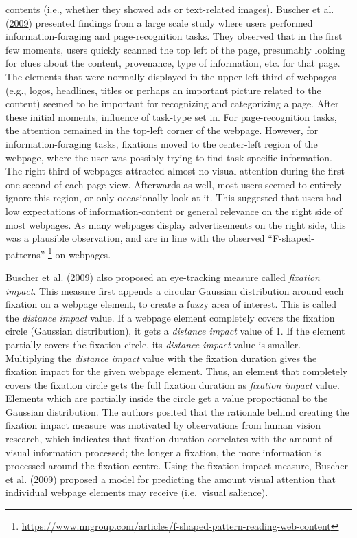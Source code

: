 \documentclass[a4paper, nobind]{templates/ociamthesis}
\begin{document}
contents (i.e., whether they showed ads or text-related images). Buscher et al. (\protect\hyperlink{ref-110}{2009})
presented findings from a large scale study where users performed
information-foraging and page-recognition tasks. They observed that in
the first few moments, users quickly scanned the top left of the page,
presumably looking for clues about the content, provenance, type of
information, etc. for that page. The elements that were normally
displayed in the upper left third of webpages (e.g., logos, headlines,
titles or perhaps an important picture related to the content) seemed to
be important for recognizing and categorizing a page. After these
initial moments, influence of task-type set in. For page-recognition
tasks, the attention remained in the top-left corner of the webpage.
However, for information-foraging tasks, fixations moved to the
center-left region of the webpage, where the user was possibly trying to
find task-specific information. The right third of webpages attracted
almost no visual attention during the first one-second of each page
view. Afterwards as well, most users seemed to entirely ignore this
region, or only occasionally look at it. This suggested that users had
low expectations of information-content or general relevance on the
right side of most webpages. As many webpages display advertisements on
the right side, this was a plausible observation, and are in line with
the observed ``F-shaped-patterns'' \footnote{\url{https://www.nngroup.com/articles/f-shaped-pattern-reading-web-content}} on webpages.

Buscher et al. (\protect\hyperlink{ref-110}{2009}) also proposed an eye-tracking measure called \emph{fixation impact}.
This measure first appends a circular Gaussian distribution around each
fixation on a webpage element, to create a fuzzy area of interest. This
is called the \emph{distance impact} value. If a webpage element completely
covers the fixation circle (Gaussian distribution), it gets a \emph{distance
impact} value of 1. If the element partially covers the fixation circle,
its \emph{distance impact} value is smaller. Multiplying the \emph{distance
impact} value with the fixation duration gives the fixation impact for
the given webpage element. Thus, an element that completely covers the
fixation circle gets the full fixation duration as \emph{fixation impact}
value. Elements which are partially inside the circle get a value
proportional to the Gaussian distribution. The authors posited that the
rationale behind creating the fixation impact measure was motivated by
observations from human vision research, which indicates that fixation
duration correlates with the amount of visual information processed; the
longer a fixation, the more information is processed around the fixation
centre. Using the fixation impact measure, Buscher et al. (\protect\hyperlink{ref-110}{2009}) proposed a model for
predicting the amount visual attention that individual webpage elements
may receive (i.e.~visual salience).
\end{document}
